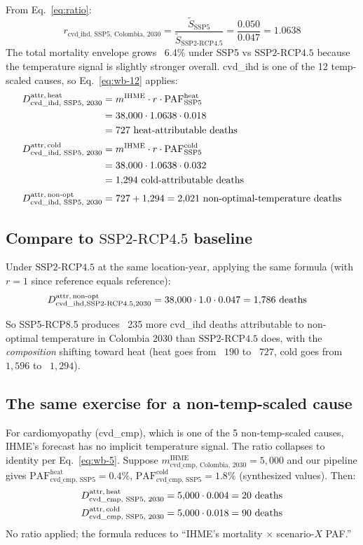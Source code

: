 \documentclass[11pt]{article}
\newcommand{\PAF}{\text{PAF}}
\newcommand{\SSPtwo}{\text{SSP2{-}RCP4.5}}
\newcommand{\mIHME}{m^{\text{IHME}}}
\begin{document}
From Eq.~\eqref{eq:ratio}:
\[
r_{\text{cvd\_ihd, SSP5, Colombia, 2030}}
= \frac{\tilde S_{\text{SSP5}}}{\tilde S_{\SSPtwo}}
= \frac{0.050}{0.047}
= 1.0638
\]
The total mortality envelope grows ~6.4\% under SSP5 vs $\SSPtwo$
because the temperature signal is slightly stronger overall. cvd\_ihd
is one of the 12 temp-scaled causes, so Eq.~\eqref{eq:wb-12} applies:
\begin{align*}
\mAttr[heat]_{\text{cvd\_ihd, SSP5, 2030}}
&= \mIHME \cdot r \cdot \PAF^{\text{heat}}_{\text{SSP5}} \\
&= 38{,}000 \cdot 1.0638 \cdot 0.018 \\
&= 727 \text{ heat-attributable deaths} \\[2pt]
\mAttr[cold]_{\text{cvd\_ihd, SSP5, 2030}}
&= \mIHME \cdot r \cdot \PAF^{\text{cold}}_{\text{SSP5}} \\
&= 38{,}000 \cdot 1.0638 \cdot 0.032 \\
&= 1{,}294 \text{ cold-attributable deaths} \\[2pt]
\mAttr[non-opt]_{\text{cvd\_ihd, SSP5, 2030}}
&= 727 + 1{,}294 = 2{,}021 \text{ non-optimal-temperature deaths}
\end{align*}

\subsection{Compare to $\SSPtwo$ baseline}

Under $\SSPtwo$ at the same location-year, applying the same formula
(with $r = 1$ since reference equals reference):
\begin{align*}
\mAttr[non-opt]_{\text{cvd\_ihd}, \SSPtwo, 2030}
&= 38{,}000 \cdot 1.0 \cdot 0.047
= 1{,}786 \text{ deaths}
\end{align*}

So SSP5-RCP8.5 produces ~235 more cvd\_ihd deaths attributable to
non-optimal temperature in Colombia 2030 than $\SSPtwo$ does, with the
\emph{composition} shifting toward heat (heat goes from ~$190$ to ~$727$,
cold goes from ~$1{,}596$ to ~$1{,}294$).

\subsection{The same exercise for a non-temp-scaled cause}

For cardiomyopathy (cvd\_cmp), which is one of the 5 non-temp-scaled
causes, IHME's forecast has no implicit temperature signal. The ratio
collapses to identity per Eq.~\eqref{eq:wb-5}. Suppose
$\mIHME_{\text{cvd\_cmp, Colombia, 2030}} = 5{,}000$ and our pipeline
gives $\PAF^{\text{heat}}_{\text{cvd\_cmp, SSP5}} = 0.4\%$,
$\PAF^{\text{cold}}_{\text{cvd\_cmp, SSP5}} = 1.8\%$ (synthesized
values). Then:
\begin{align*}
\mAttr[heat]_{\text{cvd\_cmp, SSP5, 2030}}
&= 5{,}000 \cdot 0.004 = 20 \text{ deaths} \\
\mAttr[cold]_{\text{cvd\_cmp, SSP5, 2030}}
&= 5{,}000 \cdot 0.018 = 90 \text{ deaths}
\end{align*}
No ratio applied; the formula reduces to ``IHME's mortality $\times$
scenario-$X$ PAF.''
\end{document}
